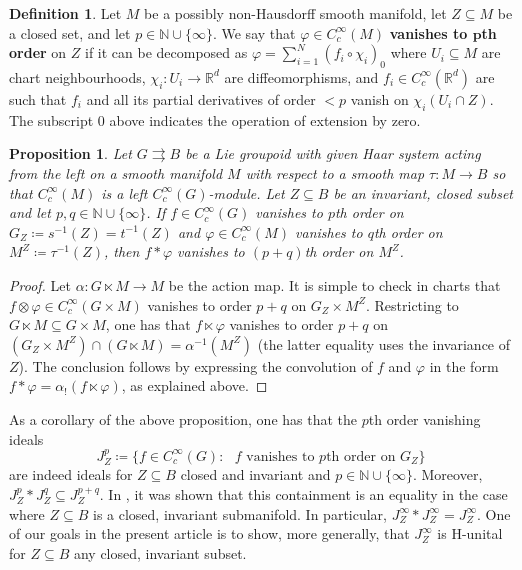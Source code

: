 \documentclass[12pt]{article}
\theoremstyle{plain}
\newtheorem{propn}[thm]{Proposition}
\theoremstyle{definition}
\newtheorem{defn}[thm]{Definition}
\newcommand{\R}{\mathbb{R}}
\numberwithin{equation}{section}
\begin{document}
\begin{defn}\label{vanishingorddef}
Let $M$ be a possibly non-Hausdorff smooth manifold, let $Z \subseteq M$ be a closed set, and let $p \in \mathbb{N}\cup\{\infty\}$.  We say that $\varphi \in C_c^\infty(M)$ \textbf{vanishes to $\textbf{p}$th order} on $Z$ if it can be decomposed as $\varphi = \sum_{i=1}^N (f_i \circ \chi_i)_0$  where  $U_i \subseteq M$ are chart neighbourhoods, $\chi_i : U_i \to \R^d$ are diffeomorphisms, and $f_i \in C_c^\infty(\R^d)$ are such that  $f_i$ and all its partial derivatives of order $<p$ vanish on $\chi_i(U_i \cap Z)$. The subscript $0$ above indicates the operation of extension by zero.  
\end{defn}









\begin{propn}
Let $G\rightrightarrows B$ be a Lie groupoid with given Haar system acting from the left on a smooth manifold $M$ with respect to a smooth map $\tau:M\to B$  so that $C_c^\infty(M)$ is a left $C_c^\infty(G)$-module. Let $Z \subseteq B$ be an invariant, closed subset and let $p,q \in \mathbb{N}\cup\{\infty\}$. If $f\in C_c^\infty(G)$ vanishes to $p$th order on $G_Z \coloneqq s^{-1}(Z) =t^{-1}(Z)$ and $\varphi \in C_c^\infty(M)$ vanishes to $q$th order on $M^Z \coloneqq \tau^{-1}(Z)$, then  $f * \varphi$ vanishes to $(p+q)$th order on $M^Z$.
\end{propn}
\begin{proof}
Let $\alpha : G \ltimes M \to M$ be the action map. It is simple to check in charts that $f \otimes \varphi \in C_c^\infty(G \times M)$ vanishes to order $p+q$ on $G_Z \times M^Z$. Restricting to $G \ltimes M  \subseteq G \times M$, one has that $f \ltimes \varphi$ vanishes to order $p+q$ on $(G_Z \times M^Z) \cap (G \ltimes M) =\alpha^{-1}(M^Z)$ (the latter equality uses the invariance of $Z$). The conclusion follows by expressing the convolution of $f$ and $\varphi$ in the form  $f * \varphi = \alpha_!(f \ltimes \varphi)$, as explained above.
\end{proof}


As a corollary of the above proposition, one has that the $p$th order vanishing ideals 
\[ J^p_Z \coloneqq \{ f \in C_c^\infty(G) :  \text{ $f$ vanishes to $p$th order on $G_Z$}\} \]
are indeed ideals for $Z\subseteq B$ closed and invariant and $p \in \mathbb{N} \cup \{\infty\}$. Moreover, $J^p_Z * J^q_Z \subseteq J^{p+q}_Z$. In \cite{Francis[DM]}, it was shown that this containment is an equality in the case where $Z \subseteq B$ is a closed, invariant submanifold. In particular, $J_Z^\infty*J_Z^\infty = J_Z^\infty$.  One of our goals in the present article is to show, more generally, that $J_Z^\infty$ is H-unital for $Z\subseteq B$ any closed, invariant subset.
\end{document}
